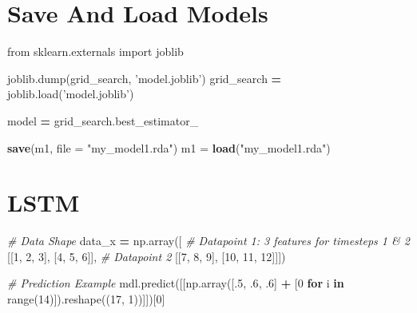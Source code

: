 \documentclass[]{book}
\newenvironment{Shaded}{\begin{snugshade}}{\end{snugshade}}
\newcommand{\BuiltInTok}[1]{#1}
\newcommand{\CommentTok}[1]{\textcolor[rgb]{0.56,0.35,0.01}{\textit{#1}}}
\newcommand{\ControlFlowTok}[1]{\textcolor[rgb]{0.13,0.29,0.53}{\textbf{#1}}}
\newcommand{\DataTypeTok}[1]{\textcolor[rgb]{0.13,0.29,0.53}{#1}}
\newcommand{\DecValTok}[1]{\textcolor[rgb]{0.00,0.00,0.81}{#1}}
\newcommand{\FloatTok}[1]{\textcolor[rgb]{0.00,0.00,0.81}{#1}}
\newcommand{\ImportTok}[1]{#1}
\newcommand{\KeywordTok}[1]{\textcolor[rgb]{0.13,0.29,0.53}{\textbf{#1}}}
\newcommand{\NormalTok}[1]{#1}
\newcommand{\OperatorTok}[1]{\textcolor[rgb]{0.81,0.36,0.00}{\textbf{#1}}}
\newcommand{\StringTok}[1]{\textcolor[rgb]{0.31,0.60,0.02}{#1}}
\begin{document}
\hypertarget{save-and-load-models}{%
\section{Save And Load Models}\label{save-and-load-models}}

\begin{Shaded}
\begin{Highlighting}[]
\ImportTok{from}\NormalTok{ sklearn.externals }\ImportTok{import}\NormalTok{ joblib}

\NormalTok{joblib.dump(grid_search, }\StringTok{'model.joblib'}\NormalTok{)}
\NormalTok{grid_search }\OperatorTok{=}\NormalTok{ joblib.load(}\StringTok{'model.joblib'}\NormalTok{)}

\NormalTok{model }\OperatorTok{=}\NormalTok{ grid_search.best_estimator_}
\end{Highlighting}
\end{Shaded}

\begin{Shaded}
\begin{Highlighting}[]
\KeywordTok{save}\NormalTok{(m1, }\DataTypeTok{file =} \StringTok{"my_model1.rda"}\NormalTok{)}
\NormalTok{m1 =}\StringTok{ }\KeywordTok{load}\NormalTok{(}\StringTok{"my_model1.rda"}\NormalTok{)}
\end{Highlighting}
\end{Shaded}

\hypertarget{lstm}{%
\section{LSTM}\label{lstm}}

\begin{Shaded}
\begin{Highlighting}[]
\CommentTok{# Data Shape}
\NormalTok{data_x }\OperatorTok{=}\NormalTok{ np.array([}
    \CommentTok{# Datapoint 1: 3 features for timesteps 1 & 2}
\NormalTok{    [[}\DecValTok{1}\NormalTok{, }\DecValTok{2}\NormalTok{, }\DecValTok{3}\NormalTok{], [}\DecValTok{4}\NormalTok{, }\DecValTok{5}\NormalTok{, }\DecValTok{6}\NormalTok{]],}
    \CommentTok{# Datapoint 2}
\NormalTok{    [[}\DecValTok{7}\NormalTok{, }\DecValTok{8}\NormalTok{, }\DecValTok{9}\NormalTok{], [}\DecValTok{10}\NormalTok{, }\DecValTok{11}\NormalTok{, }\DecValTok{12}\NormalTok{]]])}
    
\CommentTok{# Prediction Example}
\NormalTok{mdl.predict([[np.array([.}\DecValTok{5}\NormalTok{, }\FloatTok{.6}\NormalTok{, }\FloatTok{.6}\NormalTok{] }\OperatorTok{+}\NormalTok{ [}\DecValTok{0} \ControlFlowTok{for}\NormalTok{ i }\KeywordTok{in} \BuiltInTok{range}\NormalTok{(}\DecValTok{14}\NormalTok{)]).reshape((}\DecValTok{17}\NormalTok{, }\DecValTok{1}\NormalTok{))]])[}\DecValTok{0}\NormalTok{]}
\end{Highlighting}
\end{Shaded}
\end{document}
